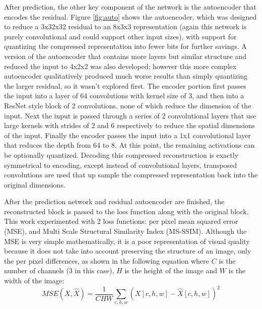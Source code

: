 \documentclass[10pt,twocolumn,letterpaper]{article}
\begin{document}
  After prediction, the other key component of the network is the autoencoder that encodes the residual. Figure \ref{fig:auto} shows the autoencoder, which was designed to reduce a 3x32x32 residual to an 8x3x3 representation (again this network is purely convolutional and could support other input sizes), with support for quantizing the compressed representation into fewer bits for further savings. A version of the autoencoder that contains more layers but similar structure and reduced the input to 4x2x2 was also developed; however this more complex autoencoder qualitatively produced much worse results than simply quantizing the larger residual, so it wasn't explored first. The encoder portion first passes the input into a layer of 64 convolutions with kernel size of 3, and then into a ResNet style block of 2 convolutions, none of which reduce the dimension of the input. Next the input is passed through a series of 2 convolutional layers that use large kernels with strides of 2 and 6 respectively to reduce the spatial dimensions of the input. Finally the encoder passes the input into a 1x1 convolutional layer that reduces the depth from 64 to 8. At this point, the remaining activations can be optionally quantized. Decoding this compressed reconstruction is exactly symmetrical to encoding, except instead of convolutional layers, transposed convolutions are used that up sample the compressed representation back into the original dimensions.

After the prediction network and residual autoencoder are finished, the reconstructed block is passed to the loss function along with the original block. This work experimented with 2 loss functions: per pixel mean squared error (MSE), and Multi Scale Structural Similarity Index (MS-SSIM)\cite{wang2003multiscale}. Although the MSE is very simple mathematically, it is a poor representation of visual quality because it does not take into account preserving the structure of an image, only the per pixel differences, as shown in the following equation where $C$ is the number of channels (3 in this case), $H$ is the height of the image and $W$ is the width of the image:
\[
  MSE(X, \hat{X}) = \frac{1}{CHW} \sum_{c, h, w}\left(X[c, h, w] - \hat{X}[c, h, w]\right)^2
\]
\end{document}
